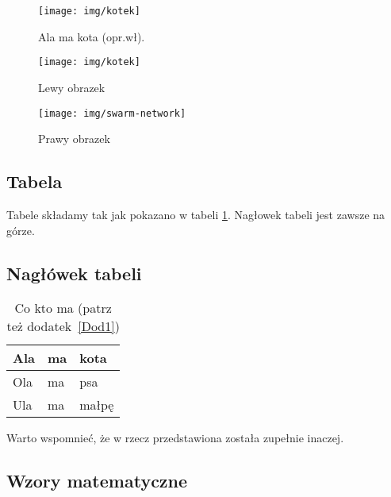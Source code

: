 \begin{figure}[h]
\centering\texttt{[image: img/kotek]}
\caption{Ala ma kota (opr.wł).}\label{rysunek:kot}
\end{figure}

\lipsum[11-12]

\begin{figure}[h] 
	\centering
	\begin{minipage}[b]{0.45\textwidth}
		\centering\texttt{[image: img/kotek]} %
		\caption{Lewy obrazek}\label{rysunek:lewy}
	\end{minipage}
	\begin{minipage}[b]{0.45\textwidth}
		\centering
		\texttt{[image: img/swarm-network]} %
		\caption{Prawy obrazek}\label{rysunek:prawy}
	\end{minipage}
\end{figure}

\lipsum[13-14]


\subsection{Tabela}

Tabele składamy tak jak pokazano w tabeli \ref{tabela:coktoma}. Nagłowek tabeli jest zawsze na górze. \lipsum[15] 

\subsection{Nagłówek tabeli}

\begin{table}
\centering\caption{Co kto ma \cite{harel_rzecz_2008} (patrz też dodatek~\ref{Dod1}) \label{tabela:coktoma}}
\begin{tabular}{|l|l|l|}%
\hline
Ala & ma & kota \\
\hline
Ola & ma & psa \\
\hline
Ula & ma & małpę\\
\hline
\end{tabular}
\end{table}

\lipsum[19-20] Warto wspomnieć, że w \cite{aizawa_groundwater_2009} rzecz przedstawiona została zupełnie inaczej. 


\subsection{Wzory matematyczne}


